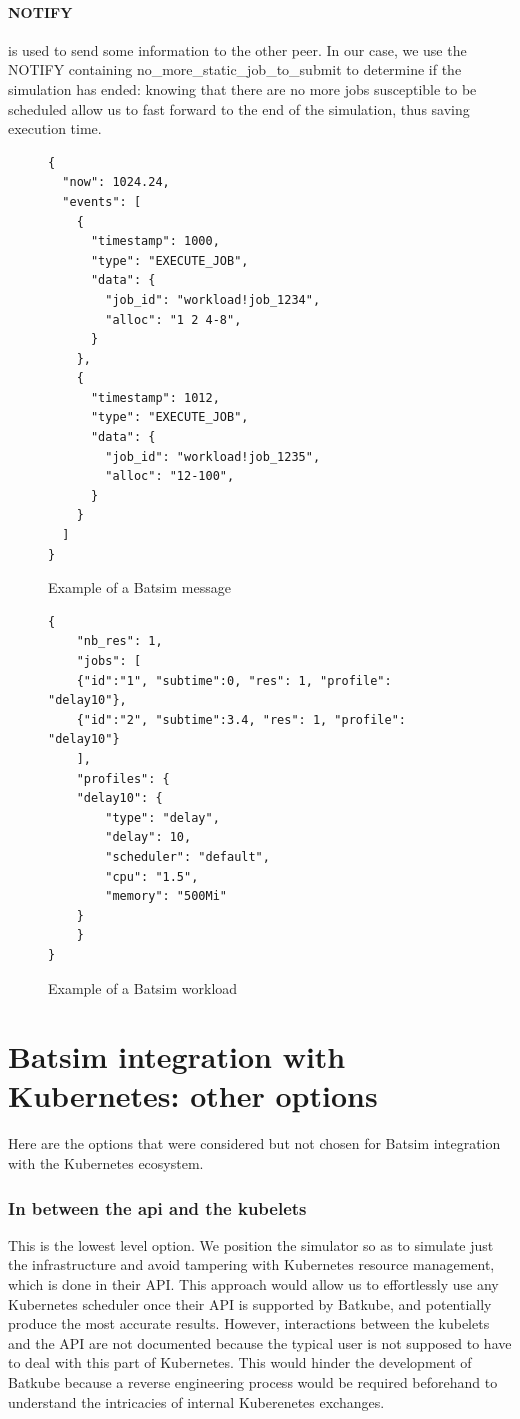 \paragraph{NOTIFY}
is used to send some information to the other peer. In our case, we use the
NOTIFY containing no\_more\_static\_job\_to\_submit to determine if the
simulation has ended: knowing that there are no more jobs susceptible to be
scheduled allow us to fast forward to the end of the simulation, thus saving
execution time.\\


\begin{figure}
	\begin{verbatim}
{
  "now": 1024.24,
  "events": [
    {
      "timestamp": 1000,
      "type": "EXECUTE_JOB",
      "data": {
        "job_id": "workload!job_1234",
        "alloc": "1 2 4-8",
      }
    },
    {
      "timestamp": 1012,
      "type": "EXECUTE_JOB",
      "data": {
        "job_id": "workload!job_1235",
        "alloc": "12-100",
      }
    }
  ]
}
\end{verbatim}
\caption{Example of a Batsim message}
\label{fig:batmsg_ex}
\end{figure}

\begin{figure}
	\begin{verbatim}
{
    "nb_res": 1,
    "jobs": [
	{"id":"1", "subtime":0, "res": 1, "profile": "delay10"},
	{"id":"2", "subtime":3.4, "res": 1, "profile": "delay10"}
    ],
    "profiles": {
	"delay10": {
	    "type": "delay",
	    "delay": 10,
	    "scheduler": "default",
	    "cpu": "1.5",
	    "memory": "500Mi"
	}
    }
}
	\end{verbatim}
	\caption{Example of a Batsim workload}
	\label{fig:bat_wl_ex}
\end{figure}

\section{Batsim integration with Kubernetes: other options} \label{sec:imp_levels}

Here are the options that were considered but not chosen for Batsim integration
with the Kubernetes ecosystem.

\subsubsection{In between the api and the kubelets}

This is the lowest level option. We position the simulator so as to simulate
just the infrastructure and avoid tampering with Kubernetes resource
management, which is done in their API. This approach would allow us to
effortlessly use any Kubernetes scheduler once their API is supported by
Batkube, and potentially produce the most accurate results. However,
interactions between the kubelets and the API are not documented because the
typical user is not supposed to have to deal with this part of Kubernetes. This
would hinder the development of Batkube because a reverse engineering process
would be required beforehand to understand the intricacies of internal
Kuberenetes exchanges.

